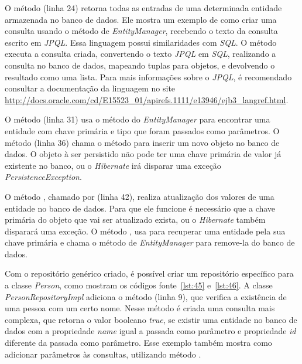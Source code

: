 O método  (linha 24) retorna todas as entradas de uma determinada entidade armazenada no banco de dados. Ele mostra um exemplo de como criar uma consulta usando o método  de \textit{EntityManager}, recebendo o texto da consulta escrito em \textit{JPQL}. Essa linguagem possui similaridades com \textit{SQL}. O método  executa a consulta criada, convertendo o texto \textit{JPQL} em \textit{SQL}, realizando a consulta no banco de dados, mapeando tuplas para objetos, e devolvendo o resultado como uma lista. Para mais informações sobre o \textit{JPQL}, é recomendado consultar a documentação da linguagem no site \url{http://docs.oracle.com/cd/E15523_01/apirefs.1111/e13946/ejb3_langref.html}.

O método  (linha 31) usa o método  do \textit{EntityManager} para encontrar uma entidade com chave primária e tipo que foram passados como parâmetros. O método  (linha 36) chama o método  para inserir um novo objeto no banco de dados. O objeto à ser persistido não pode ter uma chave primária de valor já existente no banco, ou o \textit{Hibernate} irá disparar uma exceção \textit{PersistenceException}.

O método , chamado por  (linha 42), realiza atualização dos valores de uma entidade no banco de dados. Para que ele funcione é necessário que a chave primária do objeto que vai ser atualizado exista, ou o \textit{Hibernate} também disparará uma exceção. O método , usa  para recuperar uma entidade pela sua chave primária e chama o método  de \textit{EntityManager} para remove-la do banco de dados.

Com o repositório genérico criado, é possível criar um repositório específico para a classe \textit{Person}, como mostram os códigos fonte~\ref{lst:45} e~\ref{lst:46}. A classe \textit{PersonRepositoryImpl} adiciona o método  (linha 9), que verifica a existência de uma pessoa com um certo nome. Nesse método é criada uma consulta mais complexa, que retorna o valor booleano \textit{true}, se existir uma entidade no banco de dados com a propriedade \textit{name} igual a passada como parâmetro e propriedade \textit{id} diferente da passada como parâmetro. Esse exemplo também mostra como adicionar parâmetros às consultas, utilizando método .


